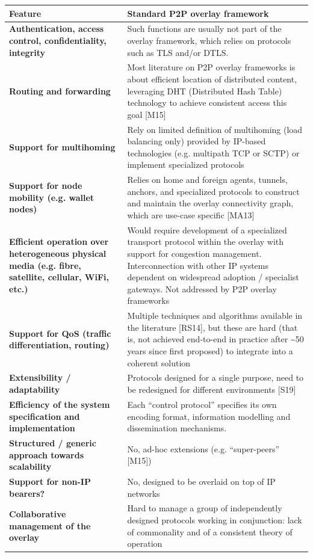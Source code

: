 \documentclass[]{article}
\begin{document}
\begin{longtable}[]{@{}ll@{}}
\toprule
Feature & Standard P2P overlay framework\tabularnewline
\midrule
\endhead
\textbf{Authentication, access control, confidentiality, integrity} &
Such functions are usually not part of the overlay framework, which
relies on protocols such as TLS and/or DTLS.\tabularnewline
\textbf{Routing and forwarding} & Most literature on P2P overlay
frameworks is about efficient location of distributed content,
leveraging DHT (Distributed Hash Table) technology to achieve consistent
access this goal {[}M15{]}\tabularnewline
\textbf{Support for multihoming} & Rely on limited definition of
multihoming (load balancing only) provided by IP-based technologies
(e.g. multipath TCP or SCTP) or implement specialized
protocols\tabularnewline
\textbf{Support for node mobility (e.g. wallet nodes)} & Relies on home
and foreign agents, tunnels, anchors, and specialized protocols to
construct and maintain the overlay connectivity graph, which are
use-case specific {[}MA13{]}\tabularnewline
\textbf{Efficient operation over heterogeneous physical media (e.g.
fibre, satellite, cellular, WiFi, etc.)} & Would require development of
a specialized transport protocol within the overlay with support for
congestion management. Interconnection with other IP systems dependent
on widespread adoption / specialist gateways. Not addressed by P2P
overlay frameworks\tabularnewline
\textbf{Support for QoS (traffic differentiation, routing)} & Multiple
techniques and algorithms available in the literature {[}RS14{]}, but
these are hard (that is, not achieved end-to-end in practice after
\textasciitilde{}50 years since first proposed) to integrate into a
coherent solution\tabularnewline
\textbf{Extensibility / adaptability} & Protocols designed for a single
purpose, need to be redesigned for different environments
{[}S19{]}\tabularnewline
\textbf{Efficiency of the system specification and implementation} &
Each ``control protocol'' specifies its own encoding format, information
modelling and dissemination mechanisms.\tabularnewline
\textbf{Structured / generic approach towards scalability} & No, ad-hoc
extensions (e.g. ``super-peers'' {[}M15{]})\tabularnewline
\textbf{Support for non-IP bearers?} & No, designed to be overlaid on
top of IP networks\tabularnewline
\textbf{Collaborative management of the overlay} & Hard to manage a
group of independently designed protocols working in conjunction: lack
of commonality and of a consistent theory of operation\tabularnewline
\bottomrule
\end{longtable}
\end{document}
